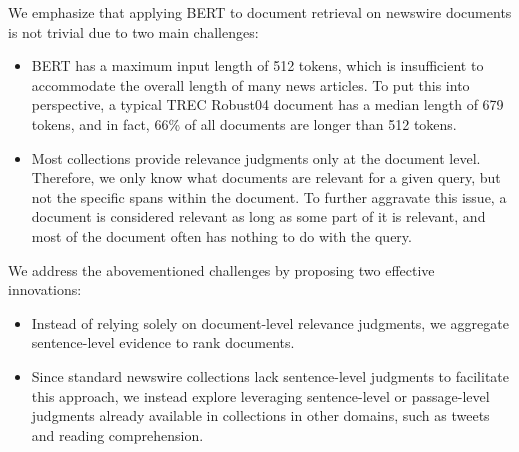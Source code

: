 We emphasize that applying BERT to document retrieval on newswire documents is not trivial due to two main challenges:\

\begin{itemize}
	\item
	BERT has a maximum input length of 512 tokens, which is insufficient to accommodate the overall length of many news articles.
	To put this into perspective, a typical TREC Robust04 document has a median length of 679 tokens, and in fact, 66\% of all documents are longer than 512 tokens.
	\item
	Most collections provide relevance judgments only at the document level.
	Therefore, we only know what documents are relevant for a given query, but not the specific spans within the document.
	To further aggravate this issue, a document is considered relevant as long as some part of it is relevant, and most of the document often has nothing to do with the query.
\end{itemize}


We address the abovementioned challenges by proposing two effective innovations:\

\begin{itemize}
	\item
	Instead of relying solely on document-level relevance judgments, we aggregate sentence-level evidence to rank documents.
	\item
	Since standard newswire collections lack sentence-level judgments to facilitate this approach, we instead explore leveraging sentence-level or passage-level judgments already available in collections in other domains, such as tweets and reading comprehension.
\end{itemize}


